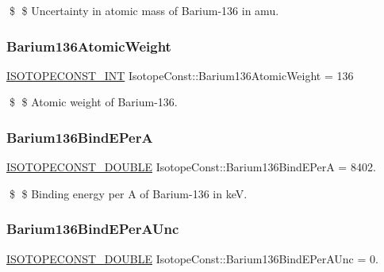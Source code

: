 \$ \$ Uncertainty in atomic mass of Barium-\/136 in amu. \mbox{\label{group___isotope_const-_barium-_ba136_gabeb93d4243c7403cc1426981315faddd}} 
\subsubsection{\texorpdfstring{Barium136\+Atomic\+Weight}{Barium136AtomicWeight}}
{\footnotesize\ttfamily \mbox{\hyperlink{group___isotope_const-_macros_ga5f18360b3e99483a35c32d789e62621c}{I\+S\+O\+T\+O\+P\+E\+C\+O\+N\+S\+T\+\_\+\+I\+NT}} Isotope\+Const\+::\+Barium136\+Atomic\+Weight = 136}

\$ \$ Atomic weight of Barium-\/136. \mbox{\label{group___isotope_const-_barium-_ba136_gaf3b9d71a77932f628255eb4fcf1392d8}} 
\subsubsection{\texorpdfstring{Barium136\+Bind\+E\+PerA}{Barium136BindEPerA}}
{\footnotesize\ttfamily \mbox{\hyperlink{group___isotope_const-_macros_ga8f45a7272ce02c0b4c65c44636ed719a}{I\+S\+O\+T\+O\+P\+E\+C\+O\+N\+S\+T\+\_\+\+D\+O\+U\+B\+LE}} Isotope\+Const\+::\+Barium136\+Bind\+E\+PerA = 8402.}

\$ \$ Binding energy per A of Barium-\/136 in keV. \mbox{\label{group___isotope_const-_barium-_ba136_ga888e6bf4a77d7e70befd6e0e10d6f40d}} 
\subsubsection{\texorpdfstring{Barium136\+Bind\+E\+Per\+A\+Unc}{Barium136BindEPerAUnc}}
{\footnotesize\ttfamily \mbox{\hyperlink{group___isotope_const-_macros_ga8f45a7272ce02c0b4c65c44636ed719a}{I\+S\+O\+T\+O\+P\+E\+C\+O\+N\+S\+T\+\_\+\+D\+O\+U\+B\+LE}} Isotope\+Const\+::\+Barium136\+Bind\+E\+Per\+A\+Unc = 0.}

